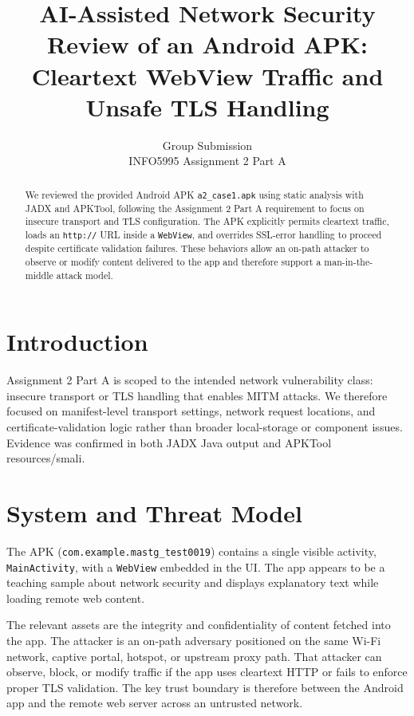 \documentclass[letterpaper,twocolumn,10pt]{article}
\begin{document}
\date{}
\title{\Large \bf AI-Assisted Network Security Review of an Android APK: Cleartext WebView Traffic and Unsafe TLS Handling}
\author{{\rm Group Submission}\\INFO5995 Assignment 2 Part A}
\maketitle

\begin{abstract}
We reviewed the provided Android APK \texttt{a2\_case1.apk} using static analysis with JADX and APKTool, following the Assignment 2 Part A requirement to focus on insecure transport and TLS configuration. The APK explicitly permits cleartext traffic, loads an \texttt{http://} URL inside a \texttt{WebView}, and overrides SSL-error handling to proceed despite certificate validation failures. These behaviors allow an on-path attacker to observe or modify content delivered to the app and therefore support a man-in-the-middle attack model.
\end{abstract}

\section{Introduction}
Assignment 2 Part A is scoped to the intended network vulnerability class: insecure transport or TLS handling that enables MITM attacks. We therefore focused on manifest-level transport settings, network request locations, and certificate-validation logic rather than broader local-storage or component issues. Evidence was confirmed in both JADX Java output and APKTool resources/smali.

\section{System and Threat Model}
The APK (\texttt{com.example.mastg\_test0019}) contains a single visible activity, \texttt{MainActivity}, with a \texttt{WebView} embedded in the UI. The app appears to be a teaching sample about network security and displays explanatory text while loading remote web content.

The relevant assets are the integrity and confidentiality of content fetched into the app. The attacker is an on-path adversary positioned on the same Wi-Fi network, captive portal, hotspot, or upstream proxy path. That attacker can observe, block, or modify traffic if the app uses cleartext HTTP or fails to enforce proper TLS validation. The key trust boundary is therefore between the Android app and the remote web server across an untrusted network.
\end{document}
